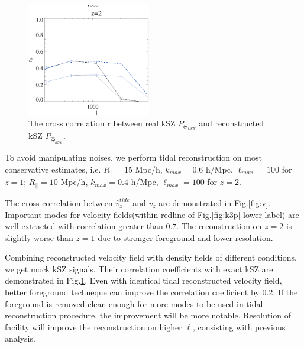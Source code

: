 \begin{figure}[tbp]
\begin{center}
\includegraphics[width=0.48\textwidth]{figure/cl_correlation_z1_z2.eps}
\end{center}
\vspace{-0.7cm}
\caption{The cross correlation r between real kSZ $P_{\Theta_{kSZ}}$ 
and reconstructed kSZ $P_{\hat \Theta_{kSZ}}$.
}
\label{fig:r}
\end{figure}
\label{ssec:tide}
To avoid manipulating noises, 
we perform tidal reconstruction on most conservative estimates, i.e. 
$R_\parallel=15$ Mpc/h, $k_{max}=0.6$ h/Mpc, $\ell_{max}=100$ for $z=1$; 
$R_\parallel=10$ Mpc/h, $k_{max}=0.4$ h/Mpc, $\ell_{max}=100$ for $z=2$. 

The cross correlation between $\hat v_z^{tide}$ and $v_z$ are demonstrated in Fig.\ref{fig:v}. 
Important modes for velocity fields(within redline of Fig.\ref{fig:k3p} lower label) are well extracted with correlation greater than $0.7$. 
The reconstruction on $z=2$ is slightly worse than $z=1$ 
due to stronger foreground and lower resolution. 

Combining reconstructed velocity field with density fields of different conditions, we get mock kSZ signals. 
Their correlation coefficients with exact kSZ are 
demonstrated in Fig.\ref{fig:r}. 
Even with identical tidal reconstructed velocity field, 
better foreground techneque can improve the correlation coefficient by 0.2. 
If the foreground is removed clean enough for more modes to be 
used in tidal reconstruction procedure, 
the improvement will be more notable.
Resolution of facility will improve the reconstruction on higher $\ell$, 
consisting with previous analysis.



